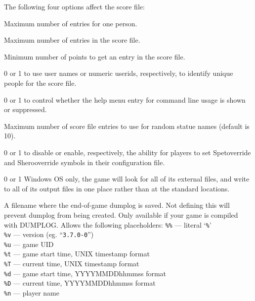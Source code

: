 \documentclass[titlepage]{article}
\begin{document}
The following four options affect the score file:
\begin{description}[font=\mdseries\itshape]
\item[PERSMAX]
Maximum number of entries for one person.
\item[ENTRYMAX]
Maximum number of entries in the score file.
\item[POINTSMIN]
Minimum number of points to get an entry in the score file.
\item[PERS\textunderscore IS\textunderscore UID]
0 or 1 to use user names or numeric userids, respectively, to identify
unique people for the score file.
\item[HIDEUSAGE]
0 or 1 to control whether the help menu entry for command
line usage is shown or suppressed.
\item[MAX\textunderscore STATUENAME\textunderscore RANK]
Maximum number of score file entries to use for
random statue names (default is 10).
\item[ACCESSIBILITY]
0 or 1 to disable or enable, respectively, the ability for players
to set S\textunderscore pet\textunderscore override and S\textunderscore hero\textunderscore override 
symbols in their configuration file.
\item[PORTABLE\textunderscore DEVICE\textunderscore PATHS]
0 or 1 Windows OS only, the game will look for all of its external
files, and write to all of its output files in one place 
rather than at the standard locations.
\item[DUMPLOGFILE]
A filename where the end-of-game dumplog is saved.
Not defining this will prevent dumplog from being created.
Only available if your game is compiled with DUMPLOG.
Allows the following placeholders:
\texttt{\%\%}  --- literal `\texttt{\%}'\\
\texttt{\%v}  --- version (eg. ``\texttt{3.7.0-0}'')\\
\texttt{\%u}  --- game UID\\
\texttt{\%t}  --- game start time, UNIX timestamp format\\
\texttt{\%T}  --- current time, UNIX timestamp format\\
\texttt{\%d}  --- game start time, YYYYMMDDhhmmss format\\
\texttt{\%D}  --- current time, YYYYMMDDhhmmss format\\
\texttt{\%n}  --- player name\\

\end{description}
\end{document}
